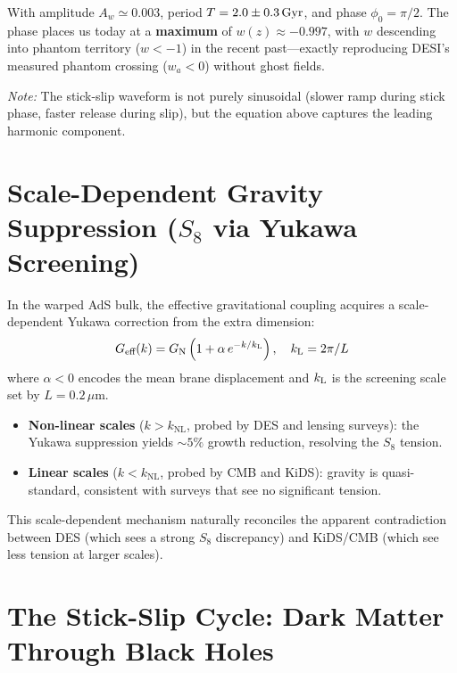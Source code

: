 With amplitude $A_w \simeq 0.003$, period $T = 2.0 \pm 0.3\,\text{Gyr}$, and phase $\phi_0 = \pi/2$. The phase places us today at a \textbf{maximum} of $w(z) \approx -0.997$, with $w$ descending into phantom territory ($w < -1$) in the recent past---exactly reproducing DESI's measured phantom crossing ($w_a < 0$) without ghost fields.

\textit{Note:} The stick-slip waveform is not purely sinusoidal (slower ramp during stick phase, faster release during slip), but the equation above captures the leading harmonic component.

\section{Scale-Dependent Gravity Suppression ($S_8$ via Yukawa Screening)}
\label{sec:yukawa}

In the warped AdS bulk, the effective gravitational coupling acquires a scale-dependent Yukawa correction from the extra dimension:
\begin{equation}
G_\text{eff}(k) = G_\text{N} \left(1 + \alpha\, e^{-k/k_\text{L}}\right), \quad k_\text{L} = 2\pi/L
\end{equation}
where $\alpha < 0$ encodes the mean brane displacement and $k_\text{L}$ is the screening scale set by $L = 0.2\,\mu$m.

\begin{itemize}
  \item \textbf{Non-linear scales} ($k > k_\text{NL}$, probed by DES and lensing surveys): the Yukawa suppression yields $\sim 5\%$ growth reduction, resolving the $S_8$ tension.
  \item \textbf{Linear scales} ($k < k_\text{NL}$, probed by CMB and KiDS): gravity is quasi-standard, consistent with surveys that see no significant tension.
\end{itemize}

This scale-dependent mechanism naturally reconciles the apparent contradiction between DES (which sees a strong $S_8$ discrepancy) and KiDS/CMB (which see less tension at larger scales).

\section{The Stick-Slip Cycle: Dark Matter Through Black Holes}
\label{sec:stick_slip}

